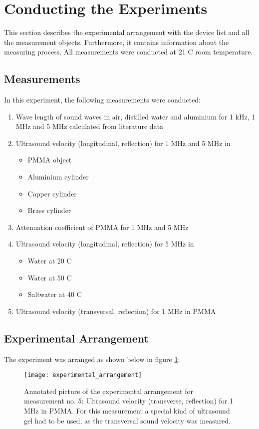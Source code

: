 \section{Conducting the Experiments}
\label{sec:Conducting_the_Experiments}
This section describes the experimental arrangement with the device list and all the measurement objects. Furthermore, it contains information about the measuring process. All measurements were conducted at 21 \textdegree C room temperature.

\subsection{Measurements}
\label{subsec:Measurements}
In this experiment, the following measurements were conducted:

\begin{enumerate}
	\item Wave length of sound waves in air, distilled water and aluminium for 1 kHz, 1 MHz and 5 MHz calculated from literature data
	\item Ultrasound velocity (longitudinal, reflection) for 1 MHz and 5 MHz in
	\begin{itemize}
		\item PMMA object
		\item Aluminium cylinder
		\item Copper cylinder
		\item Brass cylinder
	\end{itemize}
	\item Attenuation coefficient of PMMA for 1 MHz and 5 MHz
	\item Ultrasound velocity (longitudinal, reflection) for 5 MHz in
	\begin{itemize}
		\item Water at 20 \textdegree C
		\item Water at 50 \textdegree C
		\item Saltwater at 40 \textdegree C
	\end{itemize}
	\item Ultrasound velocity (transversal, reflection) for 1 MHz in PMMA
\end{enumerate}

\subsection{Experimental Arrangement}
\label{subsec:experimental_arrangement}
The experiment was arranged as shown below in figure \ref{fig:experimental_arrangement}:
\begin{figure}[H]
	\centering
	\texttt{[image: experimental\_arrangement]}
	\caption{Annotated picture of the experimental arrangement for measurement no. 5: Ultrasound velocity (transverse, reflection) for 1 MHz in PMMA. For this measurement a special kind of ultrasound gel had to be used, as the transversal sound velocity was measured.}
	\label{fig:experimental_arrangement}
\end{figure}

